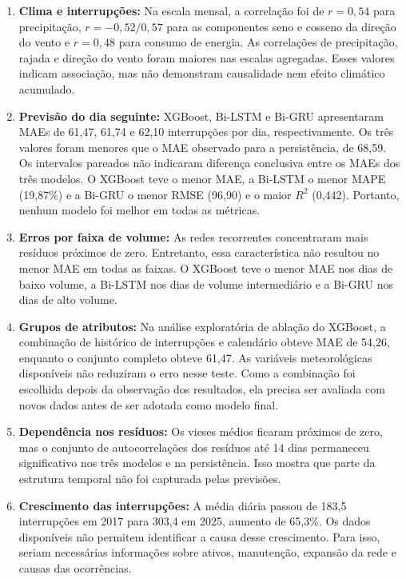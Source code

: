 \begin{enumerate}
    \item \textbf{Clima e interrupções:} Na escala mensal, a correlação foi de $r = 0{,}54$ para precipitação, $r = -0{,}52/0{,}57$ para as componentes seno e cosseno da direção do vento e $r = 0{,}48$ para consumo de energia. As correlações de precipitação, rajada e direção do vento foram maiores nas escalas agregadas. Esses valores indicam associação, mas não demonstram causalidade nem efeito climático acumulado.

    \item \textbf{Previsão do dia seguinte:} XGBoost, Bi-LSTM e Bi-GRU apresentaram MAEs de 61,47, 61,74 e 62,10 interrupções por dia, respectivamente. Os três valores foram menores que o MAE observado para a persistência, de 68,59. Os intervalos pareados não indicaram diferença conclusiva entre os MAEs dos três modelos. O XGBoost teve o menor MAE, a Bi-LSTM o menor MAPE (19,87\%) e a Bi-GRU o menor RMSE (96,90) e o maior $R^2$ (0,442). Portanto, nenhum modelo foi melhor em todas as métricas.

    \item \textbf{Erros por faixa de volume:} As redes recorrentes concentraram mais resíduos próximos de zero. Entretanto, essa característica não resultou no menor MAE em todas as faixas. O XGBoost teve o menor MAE nos dias de baixo volume, a Bi-LSTM nos dias de volume intermediário e a Bi-GRU nos dias de alto volume.

    \item \textbf{Grupos de atributos:} Na análise exploratória de ablação do XGBoost, a combinação de histórico de interrupções e calendário obteve MAE de 54,26, enquanto o conjunto completo obteve 61,47. As variáveis meteorológicas disponíveis não reduziram o erro nesse teste. Como a combinação foi escolhida depois da observação dos resultados, ela precisa ser avaliada com novos dados antes de ser adotada como modelo final.

    \item \textbf{Dependência nos resíduos:} Os vieses médios ficaram próximos de zero, mas o conjunto de autocorrelações dos resíduos até 14 dias permaneceu significativo nos três modelos e na persistência. Isso mostra que parte da estrutura temporal não foi capturada pelas previsões.

    \item \textbf{Crescimento das interrupções:} A média diária passou de 183,5 interrupções em 2017 para 303,4 em 2025, aumento de 65,3\%. Os dados disponíveis não permitem identificar a causa desse crescimento. Para isso, seriam necessárias informações sobre ativos, manutenção, expansão da rede e causas das ocorrências.


\end{enumerate}
